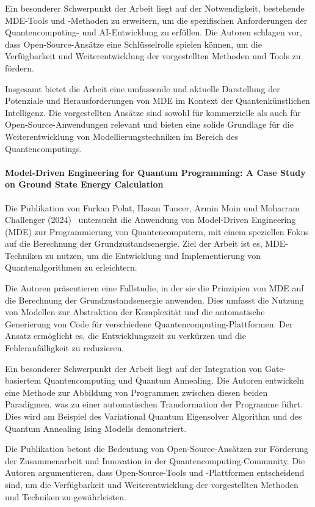 Ein besonderer Schwerpunkt der Arbeit liegt auf der Notwendigkeit, bestehende MDE-Tools und -Methoden zu erweitern, 
um die spezifischen Anforderungen der Quantencomputing- und AI-Entwicklung zu erfüllen. Die Autoren schlagen vor, dass 
Open-Source-Ansätze eine Schlüsselrolle spielen können, um die Verfügbarkeit und Weiterentwicklung der vorgestellten 
Methoden und Tools zu fördern.

Insgesamt bietet die Arbeit eine umfassende und aktuelle Darstellung der Potenziale und Herausforderungen von MDE im 
Kontext der Quantenkünstlichen Intelligenz. Die vorgestellten Ansätze sind sowohl für kommerzielle als auch für 
Open-Source-Anwendungen relevant und bieten eine solide Grundlage für die Weiterentwicklung von Modellierungstechniken 
im Bereich des Quantencomputings.

\paragraph{Model-Driven Engineering for Quantum Programming: A Case Study on Ground State Energy Calculation}

Die Publikation von Furkan Polat, Hasan Tuncer, Armin Moin und Moharram Challenger (2024)~\cite{Polat_2024} untersucht die Anwendung 
von Model-Driven Engineering (MDE) zur Programmierung von Quantencomputern, mit einem speziellen Fokus auf die 
Berechnung der Grundzustandsenergie. Ziel der Arbeit ist es, MDE-Techniken zu nutzen, um die Entwicklung und 
Implementierung von Quantenalgorithmen zu erleichtern.

Die Autoren präsentieren eine Fallstudie, in der sie die Prinzipien von MDE auf die Berechnung der Grundzustandsenergie 
anwenden. Dies umfasst die Nutzung von Modellen zur Abstraktion der Komplexität und die automatische Generierung von 
Code für verschiedene Quantencomputing-Plattformen. Der Ansatz ermöglicht es, die Entwicklungszeit zu verkürzen und 
die Fehleranfälligkeit zu reduzieren.

Ein besonderer Schwerpunkt der Arbeit liegt auf der Integration von Gate-basiertem Quantencomputing und Quantum 
Annealing. Die Autoren entwickeln eine Methode zur Abbildung von Programmen zwischen diesen beiden Paradigmen, was 
zu einer automatischen Transformation der Programme führt. Dies wird am Beispiel des Variational Quantum Eigensolver 
Algorithm und des Quantum Annealing Ising Modells demonstriert.

Die Publikation betont die Bedeutung von Open-Source-Ansätzen zur Förderung der Zusammenarbeit und Innovation in der 
Quantencomputing-Community. Die Autoren argumentieren, dass Open-Source-Tools und -Plattformen entscheidend sind, um 
die Verfügbarkeit und Weiterentwicklung der vorgestellten Methoden und Techniken zu gewährleisten.

